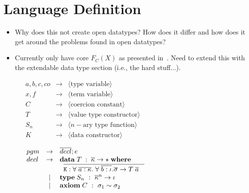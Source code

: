 \section{Language Definition}
\label{sec:langdef}
\begin{itemize}
  \item Why does this not create open datatypes? How does it differ and how
  does it get around the problems found in open datatypes?
 \item Currently only have core $F_C(X)$ as presented in~\cite{systemFC}.
 Need to extend this with the extendable data type section (i.e., the hard
 stuff...).
\end{itemize}

{\begin{figure}[H]
\vspace{2mm}

$
\begin{array}{lcl}
  a,b,c,co & \to & \langle \textrm{type variable} \rangle \\
  x,f & \to & \langle \textrm{term variable} \rangle \\
  C & \to & \langle \textrm{coercion constant} \rangle \\
  T & \to & \langle \textrm{value type constructor} \rangle \\
  S_n & \to & \langle n-\textrm{ary type function} \rangle \\
  K & \to & \langle \textrm{data constructor} \rangle
\end{array}
$

\vspace{5mm}
\vspace{2mm}

$
\begin{array}{lcl}
  pgm & \to & \overline{decl}; e \\
  decl & \to & \mathbf{data}\;{T\; : \; \overline{\kappa} \to \star \;\mathbf{where}\;} \\
  & & \;\; \overline{{\tt K} : \forall\; \overline{a:\kappa}.\;
  \forall\;\overline{b : \iota}. \overline{\sigma} \to T\; \overline{a}
       \;\;\;}  \\
  & \;|\; & \mathbf{type}\; S_n ~:~ \overline{\kappa}^n \to \iota \\
  & \;|\; & \mathbf{axiom}\; C ~:~ \sigma_1 \sim \sigma_2
\end{array}
$

\vspace{5mm}
\vspace{2mm}


\end{figure}}
